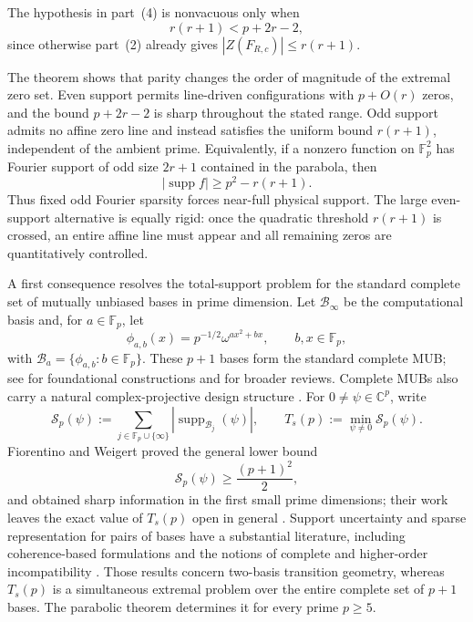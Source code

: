 \documentclass[11pt]{article}
\newcommand{\F}{\mathbb F}
\newcommand{\C}{\mathbb C}
\newcommand{\supp}{\operatorname{supp}}
\begin{document}
The hypothesis in part~(4) is nonvacuous only when
\[
 r(r+1)<p+2r-2,
\]
since otherwise part~(2) already gives
$|Z(F_{R,c})|\le r(r+1)$.

The theorem shows that parity changes the order of magnitude of the extremal
zero set.  Even support permits line-driven configurations with $p+O(r)$
zeros, and the bound $p+2r-2$ is sharp throughout the stated range.  Odd
support admits no affine zero line and instead satisfies the uniform bound
$r(r+1)$, independent of the ambient prime.  Equivalently, if a nonzero
function on $\F_p^2$ has Fourier support of odd size $2r+1$ contained in the
parabola, then
\[
 |\supp f|\ge p^2-r(r+1).
\]
Thus fixed odd Fourier sparsity forces near-full physical support.  The large
even-support alternative is equally rigid: once the quadratic threshold
$r(r+1)$ is crossed, an entire affine line must appear and all remaining
zeros are quantitatively controlled.

A first consequence resolves the total-support problem for the standard
complete set of mutually unbiased bases in prime dimension.  Let
$\mathcal B_\infty$ be the computational basis and, for $a\in\F_p$, let
\[
 \phi_{a,b}(x)=p^{-1/2}\omega^{ax^2+bx},
 \qquad b,x\in\F_p,
\]
with $\mathcal B_a=\{\phi_{a,b}:b\in\F_p\}$.  These $p+1$ bases form the
standard complete MUB; see \cite{WF,BandyopadhyayMUB,KlappeneckerRottelerConstruction}
for foundational constructions and \cite{DurtMUB,McNultyWeigertReview} for
broader reviews.  Complete MUBs also carry a natural complex-projective
design structure \cite{KlappeneckerRottelerDesign,RoyScottDesign}.  For
$0\ne\psi\in\C^p$, write
\begin{equation}
 \mathcal S_p(\psi)
 :=\sum_{j\in\F_p\cup\{\infty\}}
 |\supp_{\mathcal B_j}(\psi)|,
 \qquad
 T_s(p):=\min_{\psi\ne0}\mathcal S_p(\psi).
 \label{eq:intro-Sp-Ts}
\end{equation}
Fiorentino and Weigert proved the general lower bound
\begin{equation}
 \mathcal S_p(\psi)\ge\frac{(p+1)^2}{2},
 \label{eq:intro-FW-bound}
\end{equation}
and obtained sharp information in the first small prime dimensions; their
work leaves the exact value of $T_s(p)$ open in general \cite{FW}.  Support
uncertainty and sparse representation for pairs of bases have a substantial
literature, including coherence-based formulations and the notions of
complete and higher-order incompatibility
\cite{EladBruckstein,DeBievre,DeBievre2023,XuIncompatibility}.
Those results concern two-basis transition geometry, whereas $T_s(p)$ is a
simultaneous extremal problem over the entire complete set of $p+1$ bases.
The parabolic theorem determines it for every prime $p\ge5$.
\end{document}
